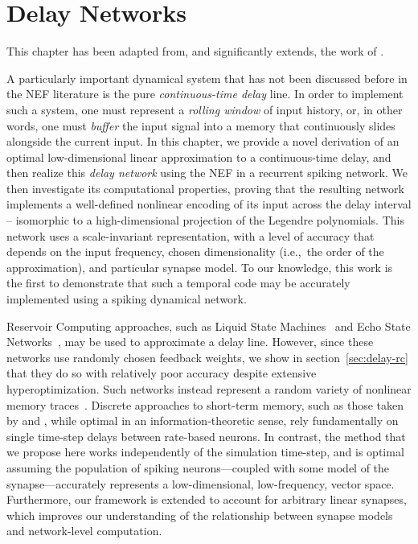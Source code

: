 \chapter{Delay Networks}
\label{chapt:delays}

This chapter has been adapted from, and significantly extends, the work of \citet[][patent pending]{voelker2015computing, dynamicspatent, voelker2018}.

A particularly important dynamical system that has not been discussed before in the NEF literature is the pure \emph{continuous-time delay} line.
In order to implement such a system, one must represent a \emph{rolling window} of input history, or, in other words, one must \emph{buffer} the input signal into a memory that continuously slides alongside the current input.
In this chapter, we provide a novel derivation of an optimal low-dimensional linear approximation to a continuous-time delay, and then realize this \emph{delay network} using the NEF in a recurrent spiking network.
We then investigate its computational properties, proving that the resulting network implements a well-defined nonlinear encoding of its input across the delay interval -- isomorphic to a high-dimensional projection of the Legendre polynomials.
This network uses a scale-invariant representation, with a level of accuracy that depends on the input frequency, chosen dimensionality (i.e.,~the order of the approximation), and particular synapse model.
To our knowledge, this work is the first to demonstrate that such a temporal code may be accurately implemented using a spiking dynamical network.

Reservoir Computing approaches, such as Liquid State Machines~\citep{maass2002real} and Echo State Networks~\citep{jaeger2001echo}, may be used to approximate a delay line.
However, since these networks use randomly chosen feedback weights, we show in section~\ref{sec:delay-rc} that they do so with relatively poor accuracy despite extensive hyperoptimization.
Such networks instead represent a random variety of nonlinear memory traces~\citep{lukovsevicius2012reservoir}.
Discrete approaches to short-term memory, such as those taken by \citet{white2004short} and \citet{ganguli2008memory}, while optimal in an information-theoretic sense, rely fundamentally on single time-step delays between rate-based neurons.
In contrast, the method that we propose here works independently of the simulation time-step, and is optimal assuming the population of spiking neurons---coupled with some model of the synapse---accurately represents a low-dimensional, low-frequency, vector space.
Furthermore, our framework is extended to account for arbitrary linear synapses, which improves our understanding of the relationship between synapse models and network-level computation.

